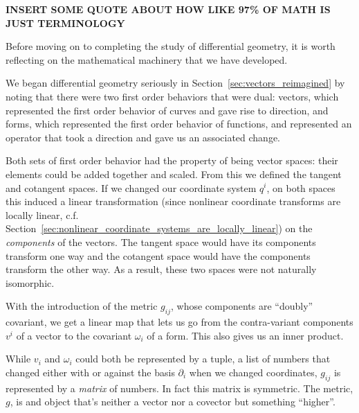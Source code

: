 	\textbf{INSERT SOME QUOTE ABOUT HOW LIKE 97\% OF MATH IS JUST TERMINOLOGY}
	
	Before moving on to completing the study of differential geometry, it is worth reflecting on the mathematical machinery that we have developed. 
	
	We began differential geometry seriously in Section~\ref{sec:vectors_reimagined} by noting that there were two first order behaviors that were dual: vectors, which represented the first order behavior of curves and gave rise to direction, and forms, which represented the first order behavior of functions, and represented an operator that took a direction and gave us an associated change.
	
	Both sets of first order behavior had the property of being vector spaces: their elements could be added together and scaled. From this we defined the tangent and cotangent spaces. If we changed our coordinate system $q^i$, on both spaces this induced a linear transformation (since nonlinear coordinate transforms are locally linear, c.f. Section~\ref{sec:nonlinear_coordinate_systems_are_locally_linear}) on the  \emph{components} of the vectors. The tangent space would have its components transform one way and the cotangent space would have the components transform the other way. As a result, these two spaces were not naturally isomorphic.
	
	With the introduction of the metric $g_{ij}$, whose components are ``doubly'' covariant, we get a linear map that lets us go from the contra-variant components $v^i$ of a vector to the covariant $\omega_i$ of a form. This also gives us an inner product. 
	
	While $v_i$ and $\omega_i$ could both be represented by a tuple, a list of numbers that changed either with or against the basis $\partial_i$ when we changed coordinates, $g_{ij}$ is represented by a \emph{matrix} of numbers. In fact this matrix is symmetric. The metric, $g$, is and object that's neither a vector nor a covector but something ``higher''.
	
